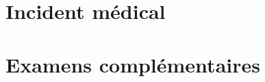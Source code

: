 \documentclass[
    todoNote,
    english,
    french
]{ClasseGuillaume}
\begin{document}
\chapter{Incident médical}




\appendix
\chapter{Examens complémentaires}
\label{annexe:examens_complementaires}


\backmatter
\listoffigures                              %
\listofillustrations                        %
\listoftables
\printbibliography[title={Bibliographie}]
\end{document}
